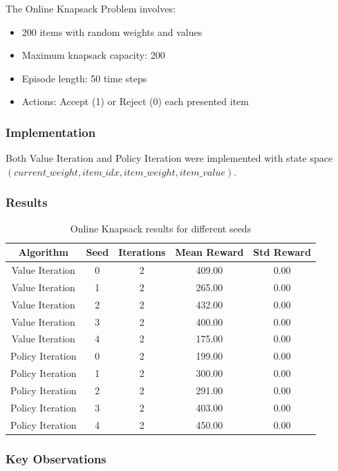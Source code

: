 \documentclass[12pt]{article}
\begin{document}
The Online Knapsack Problem involves:
\begin{itemize}
    \item 200 items with random weights and values
    \item Maximum knapsack capacity: 200
    \item Episode length: 50 time steps
    \item Actions: Accept (1) or Reject (0) each presented item
\end{itemize}

\subsubsection{Implementation}

Both Value Iteration and Policy Iteration were implemented with state space $(current\_weight, item\_idx, item\_weight, item\_value)$.

\subsubsection{Results}

\begin{table}[H]
\centering
\begin{tabular}{|c|c|c|c|c|}
\hline
Algorithm & Seed & Iterations & Mean Reward & Std Reward \\
\hline
Value Iteration & 0 & 2 & 409.00 & 0.00 \\
Value Iteration & 1 & 2 & 265.00 & 0.00 \\
Value Iteration & 2 & 2 & 432.00 & 0.00 \\
Value Iteration & 3 & 2 & 400.00 & 0.00 \\
Value Iteration & 4 & 2 & 175.00 & 0.00 \\
Policy Iteration & 0 & 2 & 199.00 & 0.00 \\
Policy Iteration & 1 & 2 & 300.00 & 0.00 \\
Policy Iteration & 2 & 2 & 291.00 & 0.00 \\
Policy Iteration & 3 & 2 & 403.00 & 0.00 \\
Policy Iteration & 4 & 2 & 450.00 & 0.00 \\
\hline
\end{tabular}
\caption{Online Knapsack results for different seeds}
\end{table}

\subsubsection{Key Observations}
\end{document}

